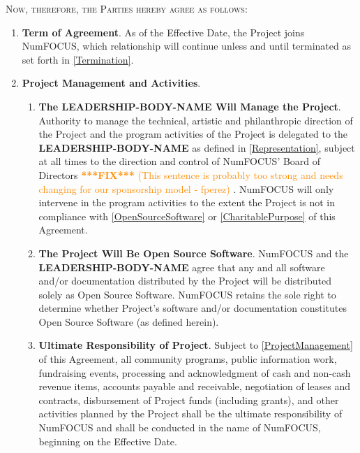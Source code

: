 \documentclass[english,letterpaper,12pt]{article}
\newcommand{\fix}[1]{
  \textcolor{darkorange} { \textbf{***FIX***} #1 } }
\newcommand{\leadershipbody}{\textbf{LEADERSHIP-BODY-NAME}}
\begin{document}
\medskip{}

\textsc{Now, therefore, the Parties hereby agree as follows:}

\begin{enumerate}[label=\arabic*.,ref=\S~\arabic*]
\item \textbf{Term of Agreement}. As of the Effective Date, the Project
joins NumFOCUS, which relationship will continue unless and until
terminated as set forth in \ref{Termination}. 
\item \textbf{Project Management and Activities}.


\begin{enumerate}[label=\alph*.,ref=\theenumi(\alph*)]

\item \textbf{The \leadershipbody{} Will Manage the
  Project}. \label{ProjectManagement} Authority to manage the technical,
  artistic and philanthropic direction of the Project and the program
  activities of the Project is delegated to the \leadershipbody{} as defined in
  \ref{Representation}, subject at all times to the direction and control of
  NumFOCUS' Board of Directors \fix{(This sentence is probably too strong and
    needs changing for our sponsorship model - fperez)}. NumFOCUS will only intervene in the program
  activities to the extent the Project is not in compliance with
  \ref{OpenSourceSoftware} or \ref{CharitablePurpose} of this Agreement.
  
\item \textbf{The Project Will Be Open Source
  Software}. \label{OpenSourceSoftware} NumFOCUS and the \leadershipbody{}
  agree that any and all software and/or documentation distributed by the
  Project will be distributed solely as Open Source Software.  NumFOCUS retains
  the sole right to determine whether Project's software and/or documentation
  constitutes Open Source Software (as defined herein).
  
\item \textbf{Ultimate Responsibility of Project}. Subject to
  \ref{ProjectManagement} of this Agreement, all community programs, public
  information work, fundraising events, processing and acknowledgment of cash
  and non-cash revenue items, accounts payable and receivable, negotiation of
  leases and contracts, disbursement of Project funds (including grants), and
  other activities planned by the Project shall be the ultimate responsibility
  of NumFOCUS and shall be conducted in the name of NumFOCUS, beginning on the
  Effective Date.
  

\end{enumerate}
\end{enumerate}
\end{document}
